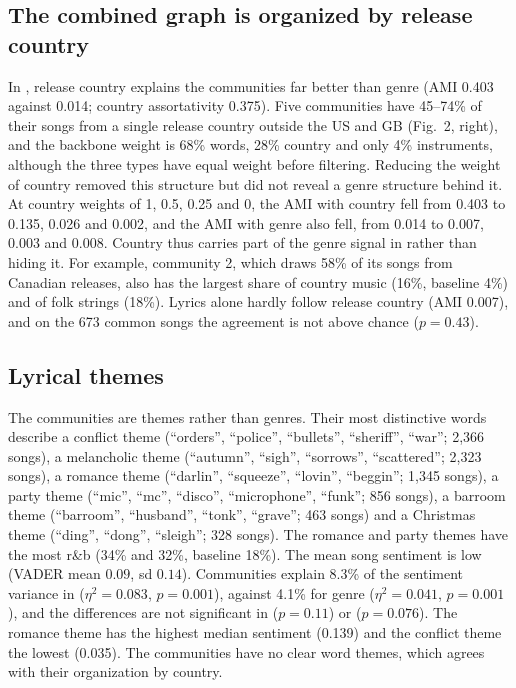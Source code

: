 \subsection*{The combined graph is organized by release country}
In \Gcomb, release country explains the communities far better than genre (AMI 0.403 against 0.014; country assortativity 0.375). Five communities have 45--74\% of their songs from a single release country outside the US and GB (Fig.~2, right), and the backbone weight is 68\% words, 28\% country and only 4\% instruments, although the three types have equal weight before filtering. Reducing the weight of country removed this structure but did not reveal a genre structure behind it. At country weights of 1, 0.5, 0.25 and 0, the AMI with country fell from 0.403 to 0.135, 0.026 and 0.002, and the AMI with genre also fell, from 0.014 to 0.007, 0.003 and 0.008. Country thus carries part of the genre signal in \Gcomb{} rather than hiding it. For example, community 2, which draws 58\% of its songs from Canadian releases, also has the largest share of country music (16\%, baseline 4\%) and of folk strings (18\%). Lyrics alone hardly follow release country (AMI 0.007), and on the 673 common songs the agreement is not above chance ($p = 0.43$).

\subsection*{Lyrical themes}
The \Glyr{} communities are themes rather than genres. Their most distinctive words describe a conflict theme (``orders'', ``police'', ``bullets'', ``sheriff'', ``war''; 2,366 songs), a melancholic theme (``autumn'', ``sigh'', ``sorrows'', ``scattered''; 2,323 songs), a romance theme (``darlin'', ``squeeze'', ``lovin'', ``beggin''; 1,345 songs), a party theme (``mic'', ``mc'', ``disco'', ``microphone'', ``funk''; 856 songs), a barroom theme (``barroom'', ``husband'', ``tonk'', ``grave''; 463 songs) and a Christmas theme (``ding'', ``dong'', ``sleigh''; 328 songs). The romance and party themes have the most r\&b (34\% and 32\%, baseline 18\%). The mean song sentiment is low (VADER mean $0.09$, sd $0.14$). Communities explain 8.3\% of the sentiment variance in \Glyr{} ($\eta^2 = 0.083$, $p = 0.001$), against 4.1\% for genre ($\eta^2 = 0.041$, $p = 0.001$), and the differences are not significant in \Ginst{} ($p = 0.11$) or \Gcomb{} ($p = 0.076$). The romance theme has the highest median sentiment (0.139) and the conflict theme the lowest (0.035). The \Gcomb{} communities have no clear word themes, which agrees with their organization by country.

